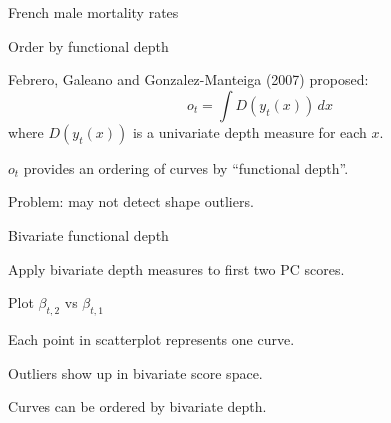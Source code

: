 \documentclass[14pt]{beamer}
\begin{document}
\begin{frame}{French male mortality rates}

%

\end{frame}


\begin{frame}{Order by functional depth}

Febrero, Galeano and Gonzalez-Manteiga (2007) proposed:
\[
o_t = \int D(y_t(x))\,dx
\]
where $D(y_t(x))$ is a univariate depth measure for each $x$.
\biz
\item $o_t$ provides an ordering of curves by ``functional depth''.
\item Problem: may not detect shape outliers.
\eiz

\end{frame}


\begin{frame}{Bivariate functional depth}

 Apply bivariate depth measures to first two PC scores.
\vspace*{0.4cm}

Plot $\beta_{t,2}$ vs $\beta_{t,1}$
\biz
\item[\ding{229}] Each point in scatterplot represents one curve.
\item[\ding{229}] Outliers show up in bivariate score space.
\item[\ding{229}] Curves can be ordered by bivariate depth.
\eiz
\end{frame}
\end{document}
